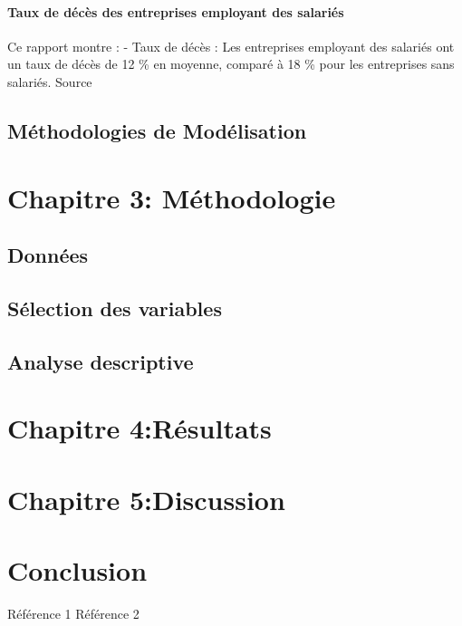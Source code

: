 \documentclass[a4paper,12pt]{report}
\renewcommand{\thesection}{\Roman{section}.}
\begin{document}
\subsubsection{Taux de décès des entreprises employant des salariés}
Ce rapport montre : - Taux de décès : Les entreprises employant des salariés ont un taux de décès de 12 \% en moyenne, comparé à 18 \% pour les entreprises sans salariés. Source
\section{Méthodologies de Modélisation}

\chapter*{Chapitre 3: Méthodologie}
\setcounter{section}{0}  %
\renewcommand\thesection{\Roman{section}} 
\section{Données}

\section{Sélection des variables}

\section{Analyse descriptive}

\chapter*{Chapitre 4:Résultats}

\chapter*{Chapitre 5:Discussion}


\chapter*{Conclusion}

\begin{thebibliography}{99}
 Référence 1
 Référence 2
\end{thebibliography}
\end{document}
